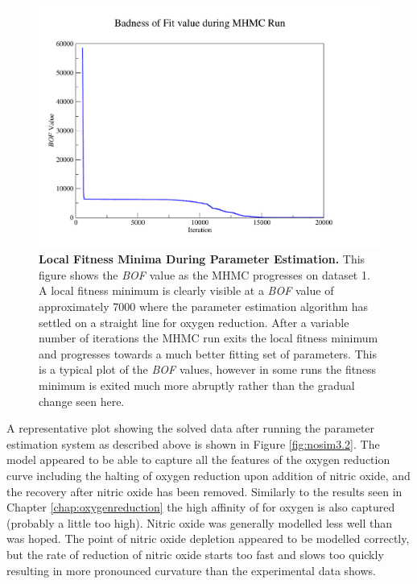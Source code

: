 \begin{figure}[tbp]
 \centering
 \includegraphics[width=15cm, trim=0.5cm 1cm 3cm 1cm, clip=true]{./06-noreduction/data/ds3-bof.pdf}
 \caption[{Local Fitness Minima During Parameter Estimation.}]{{\bf Local Fitness Minima During Parameter Estimation.} This figure shows the \textit{BOF} value as the MHMC progresses on dataset 1. A local fitness minimum is clearly visible at a \textit{BOF} value of approximately 7000 where the parameter estimation algorithm has settled on a straight line for oxygen reduction. After a variable number of iterations the MHMC run exits the local fitness minimum and progresses towards a much better fitting set of parameters. This is a typical plot of the \textit{BOF} values, however in some runs the fitness minimum is exited much more abruptly rather than the gradual change seen here.}
 \label{fig:nosim3-bof}
\end{figure}

A representative plot showing the solved data after running the parameter estimation system as described above is shown in Figure \ref{fig:nosim3.2}. The model appeared to be able to capture all the features of the oxygen reduction curve including the halting of oxygen reduction upon addition of nitric oxide, and the recovery after nitric oxide has been removed. Similarly to the results seen in Chapter \ref{chap:oxygenreduction} the high affinity of \cbbthree{} for oxygen is also captured (probably a little too high). Nitric oxide was generally modelled less well than was hoped. The point of nitric oxide depletion appeared to be modelled correctly, but the rate of reduction of nitric oxide starts too fast and slows too quickly resulting in more pronounced curvature than the experimental data shows.

